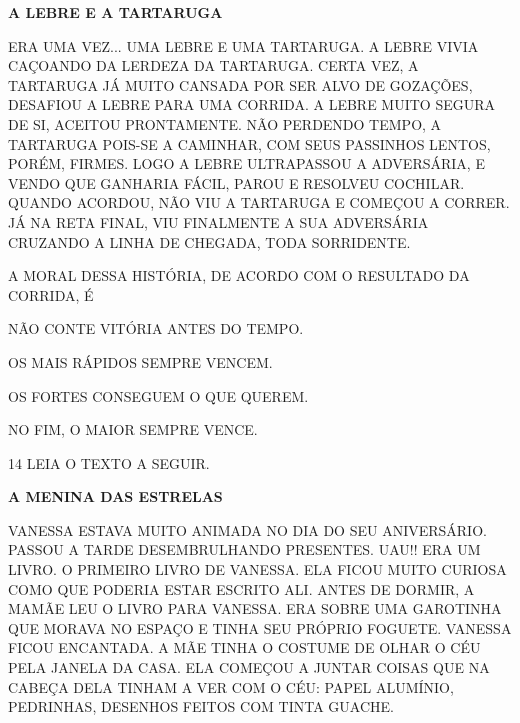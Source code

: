 \begin{myquote}
\textbf{A LEBRE E A TARTARUGA}

ERA UMA VEZ... UMA LEBRE E UMA TARTARUGA.
A LEBRE VIVIA CAÇOANDO DA LERDEZA DA TARTARUGA.
CERTA VEZ, A TARTARUGA JÁ MUITO CANSADA POR SER ALVO DE GOZAÇÕES, DESAFIOU A LEBRE PARA UMA CORRIDA.
A LEBRE MUITO SEGURA DE SI, ACEITOU PRONTAMENTE.
NÃO PERDENDO TEMPO, A TARTARUGA POIS-SE A CAMINHAR, COM SEUS PASSINHOS LENTOS, PORÉM, FIRMES.
LOGO A LEBRE ULTRAPASSOU A ADVERSÁRIA, E VENDO QUE GANHARIA FÁCIL, PAROU E RESOLVEU COCHILAR.
QUANDO ACORDOU, NÃO VIU A TARTARUGA E COMEÇOU A CORRER.
JÁ NA RETA FINAL, VIU FINALMENTE A SUA ADVERSÁRIA CRUZANDO A LINHA DE CHEGADA, TODA SORRIDENTE.

\end{myquote}

A MORAL DESSA HISTÓRIA, DE ACORDO COM O RESULTADO DA CORRIDA, É

\begin{escolha}

\item NÃO CONTE VITÓRIA ANTES DO TEMPO.

\item OS MAIS RÁPIDOS SEMPRE VENCEM.

\item OS FORTES CONSEGUEM O QUE QUEREM.

\item NO FIM, O MAIOR SEMPRE VENCE.

\end{escolha}

\num{14} LEIA O TEXTO A SEGUIR.

\begin{myquote}
\textbf{A MENINA DAS ESTRELAS}

VANESSA ESTAVA MUITO ANIMADA NO DIA DO SEU ANIVERSÁRIO. PASSOU A TARDE DESEMBRULHANDO PRESENTES. UAU!! ERA UM LIVRO. O PRIMEIRO LIVRO DE VANESSA. ELA FICOU MUITO CURIOSA COMO QUE PODERIA ESTAR ESCRITO ALI.
ANTES DE DORMIR, A MAMÃE LEU O LIVRO PARA VANESSA. ERA SOBRE UMA GAROTINHA QUE MORAVA NO ESPAÇO E TINHA SEU PRÓPRIO FOGUETE. VANESSA FICOU ENCANTADA. A MÃE TINHA O COSTUME DE OLHAR O CÉU PELA JANELA DA CASA. ELA COMEÇOU A JUNTAR COISAS QUE NA CABEÇA DELA TINHAM A VER COM O CÉU: PAPEL ALUMÍNIO, PEDRINHAS, DESENHOS FEITOS COM TINTA GUACHE.

\end{myquote}

